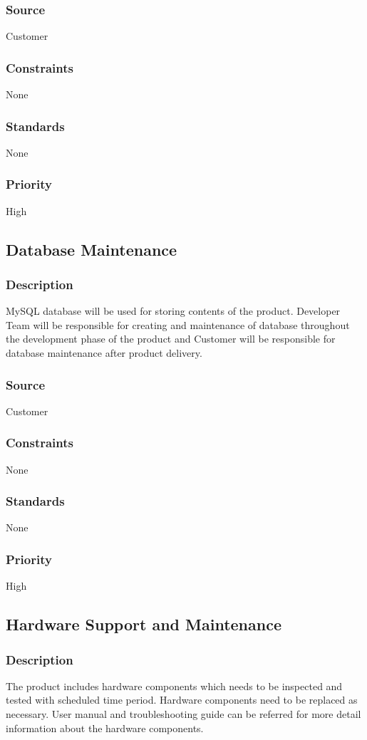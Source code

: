 \subsubsection{Source}
Customer
\subsubsection{Constraints}
None
\subsubsection{Standards}
None
\subsubsection{Priority}
High

\subsection{Database Maintenance}
\subsubsection{Description}
MySQL database will be used for storing contents of the product. Developer Team will be responsible for creating and maintenance of database throughout the development phase of the product and Customer will be responsible for database maintenance after product delivery. 
\subsubsection{Source}
Customer
\subsubsection{Constraints}
None
\subsubsection{Standards}
None
\subsubsection{Priority}
High

\subsection{Hardware Support and Maintenance}
\subsubsection{Description}
The product includes hardware components which needs to be inspected and tested with scheduled time period. Hardware components need to be replaced as necessary. User manual and troubleshooting guide can be referred for more detail information about the hardware components. 

